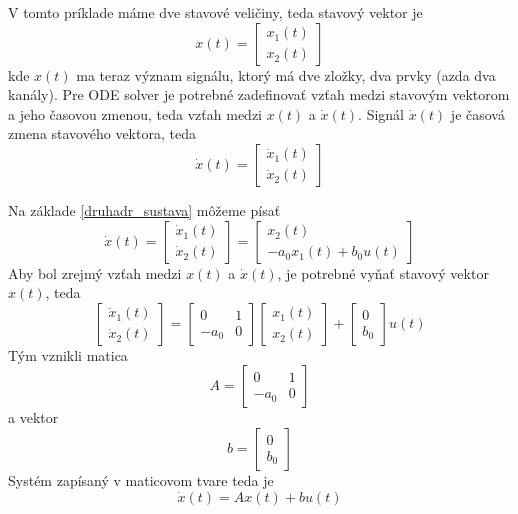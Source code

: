 \documentclass[a4paper, 10pt, ]{article}
\begin{document}
V tomto príklade máme dve stavové veličiny, teda stavový vektor je
\begin{equation}
    x(t) = \begin{bmatrix} x_1(t) \\ x_2(t) \end{bmatrix}
\end{equation}
kde $x(t)$ ma teraz význam signálu, ktorý má dve zložky, dva prvky (azda dva kanály). Pre ODE solver je potrebné zadefinovať vzťah medzi stavovým vektorom a jeho časovou zmenou, teda vzťah medzi $x(t)$ a $\dot x(t)$. Signál $\dot x(t)$ je časová zmena stavového vektora, teda
\begin{equation}
    \dot x(t) = \begin{bmatrix} \dot x_1(t) \\ \dot x_2(t) \end{bmatrix}
\end{equation}

Na základe \eqref{druhadr_sustava} môžeme písať
\begin{equation}
    \dot x(t) = \begin{bmatrix} \dot x_1(t) \\ \dot x_2(t) \end{bmatrix} = \begin{bmatrix} x_2(t) \\ - a_0 x_1(t) +  b_0 u(t) \end{bmatrix}
\end{equation}
Aby bol zrejmý vzťah medzi $x(t)$ a $\dot x(t)$, je potrebné vyňať stavový vektor $x(t)$, teda 
\begin{equation}
     \begin{bmatrix} \dot x_1(t) \\ \dot x_2(t) \end{bmatrix} = \begin{bmatrix} 0 & 1 \\ -a_0 & 0 \end{bmatrix} \begin{bmatrix} x_1(t) \\ x_2(t) \end{bmatrix} + \begin{bmatrix} 0 \\ b_0 \end{bmatrix} u(t)
\end{equation}
Tým vznikli matica 
\begin{equation}
    A = \begin{bmatrix} 0 & 1 \\ -a_0 & 0 \end{bmatrix}
\end{equation}
a vektor
\begin{equation}
    b = \begin{bmatrix} 0 \\ b_0 \end{bmatrix}
\end{equation}
Systém zapísaný v maticovom tvare teda je
\begin{equation} \label{stavovyPriestorPriklad}
    \dot x(t) = Ax(t) + bu(t)   
\end{equation}
\end{document}
